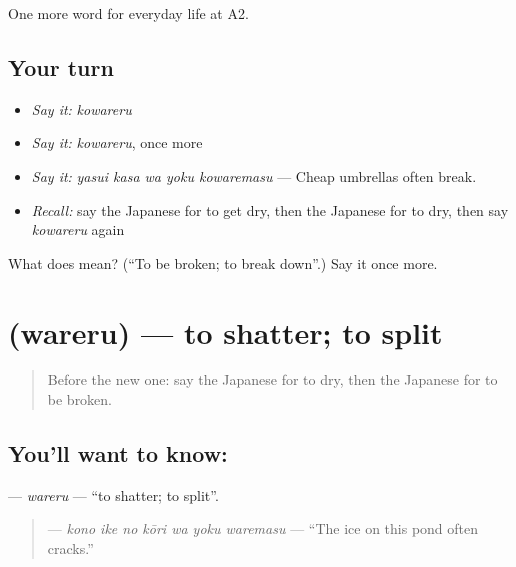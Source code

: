 \begin{grammarlens}[title={What you've built}]
One more word for everyday life at A2.
\end{grammarlens}

\subsection*{Your turn}
\begin{itemize}
\raggedright
  \item \emph{Say it:} \emph{kowareru}
  \item \emph{Say it:} \emph{kowareru}, once more
  \item \emph{Say it:} \emph{yasui kasa wa yoku kowaremasu} — Cheap umbrellas often break.
  \item \emph{Recall:} say the Japanese for to get dry, then the Japanese for to dry, then say \emph{kowareru} again
\end{itemize}

\begin{tcolorbox}[breakable,colback=teal!4,colframe=teal!35!black,title={Before you move on}]
What does  mean? (\textquotedblleft{}To be broken; to break down\textquotedblright{}.) Say it once more.
\end{tcolorbox}
\section[\texorpdfstring{\ja{われる} (wareru)}{われる (wareru)}]{ (wareru) — to shatter; to split}

\label{lesson:JA-C162-wareru}



\begin{quote}
Before the new one: say the Japanese for to dry, then the Japanese for to be broken.
\end{quote}

\subsection*{You'll want to know: }
\textbf{} — \emph{wareru} — \textquotedblleft{}to shatter; to split\textquotedblright{}.

\begin{quote}
\textbf{    } — \emph{kono ike no kōri wa yoku waremasu} — \textquotedblleft{}The ice on this pond often cracks.\textquotedblright{}
\end{quote}

